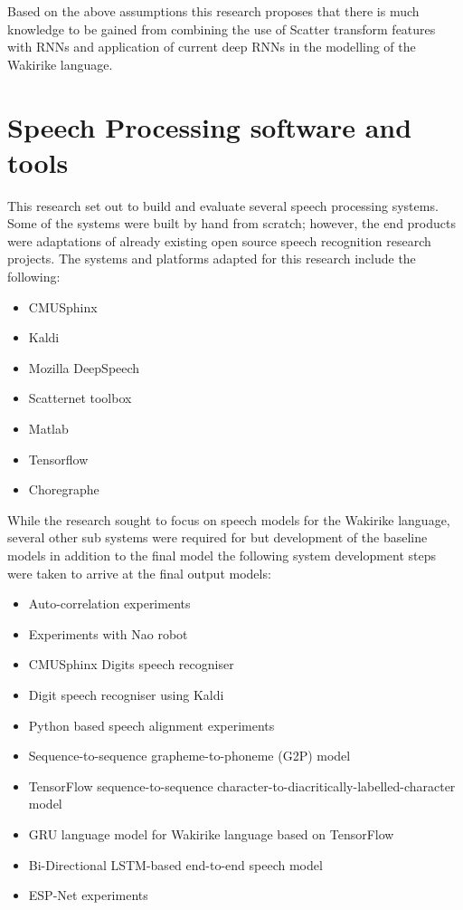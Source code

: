 Based on the above assumptions this research proposes that there is much knowledge to be gained from combining the use of Scatter transform features with RNNs and application of current deep RNNs in the modelling of the Wakirike language.

\section{Speech Processing software and tools}
This research set out to build and evaluate several speech processing systems.  Some of the systems were built by hand from scratch; however, the end products were adaptations of already existing open source speech recognition research projects.  The systems and platforms adapted for this research include the following:
\begin{itemize}
    \item CMUSphinx
    \item Kaldi
    \item Mozilla DeepSpeech
    \item Scatternet toolbox
    \item Matlab
    \item Tensorflow
    \item Choregraphe
\end{itemize}

While the research sought to focus on speech models for the Wakirike language, several other sub systems were required for but development of the baseline models in addition to the final model the following system development steps were taken to arrive at the final output models:
\begin{itemize}
    \item Auto-correlation experiments
    \item Experiments with Nao robot
    \item CMUSphinx Digits speech recogniser
    \item Digit speech recogniser using Kaldi
    \item Python based speech alignment experiments
    \item Sequence-to-sequence grapheme-to-phoneme (G2P) model
    \item TensorFlow sequence-to-sequence character-to-diacritically-labelled-character model
    \item GRU language model for Wakirike language based on TensorFlow
    \item Bi-Directional LSTM-based end-to-end speech model
    \item ESP-Net experiments
\end{itemize}

